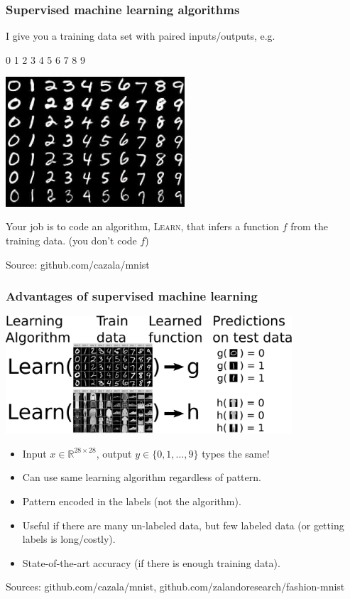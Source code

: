 \documentclass{beamer}
\newcommand{\RR}{\mathbb R}
\begin{document}
\begin{frame}
  \frametitle{Supervised machine learning algorithms}

  I give you a training data set with paired inputs/outputs, e.g.

  \begin{center}
    \Huge 0 1 2 3 4 5 6 7 8 9

  \includegraphics[height=1.9in]{mnist-digits}
  \end{center}

  Your job is to code an algorithm, \textsc{Learn}, that infers a
  function $f$ from the training data. (you don't code $f$)
  
  \scriptsize Source: github.com/cazala/mnist
\end{frame}


\begin{frame}
  \frametitle{Advantages of supervised machine learning}

  \begin{center}
    \includegraphics[width=0.8\textwidth]{drawing-mnist-train-test.pdf}
  \end{center}
  \vskip -0.2cm
  
  \begin{itemize}
  \item Input $x\in\RR^{28\times 28}$, output $y\in\{0,1,\dots,9\}$
    types the same!
  \item Can use same learning algorithm regardless of pattern.
  \item Pattern encoded in the labels (not the algorithm).
  \item Useful if there are many un-labeled data, but few labeled data
    (or getting labels is long/costly).
  \item State-of-the-art accuracy (if there is enough training data).
  \end{itemize}

  \scriptsize Sources: github.com/cazala/mnist, github.com/zalandoresearch/fashion-mnist

\end{frame}
\end{document}
